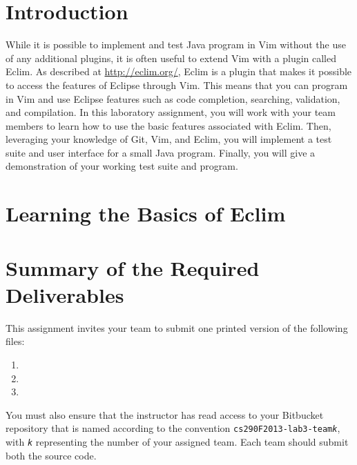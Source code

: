 

\usepackage[compact]{titlesec}



\section*{Introduction}

While it is possible to implement and test Java program in Vim without the use of any additional plugins, it is often
useful to extend Vim with a plugin called Eclim.  As described at \url{http://eclim.org/}, Eclim is a plugin that makes
it possible to access the features of Eclipse through Vim.  This means that you can program in Vim and use Eclipse
features such as code completion, searching, validation, and compilation. In this laboratory assignment, you will work
with your team members to learn how to use the basic features associated with Eclim.  Then, leveraging your knowledge of
Git, Vim, and Eclim, you will implement a test suite and user interface for a small Java program.  Finally, you will 
give a demonstration of your working test suite and program.

\section*{Learning the Basics of Eclim}

\section*{Summary of the Required Deliverables}

This assignment invites your team to submit one printed version of the following files:

\begin{enumerate}
	
	\item 
	\item 
	\item 

\end{enumerate}

You must also ensure that the instructor has read access to your Bitbucket repository that is named according to the
convention {\tt cs290F2013-lab3-team{\em k}}, with {\tt {\em k}} representing the number of your assigned team. 
Each team should submit both the source code.


